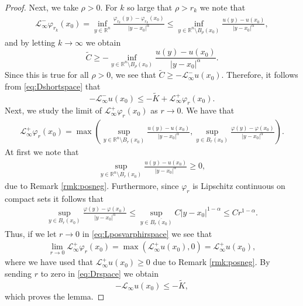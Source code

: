 \documentclass[11pt]{article}
\providecommand{\Linf}{\mathcal{L}_{\infty}}
\providecommand{\Lpos}{\mathcal{L}_{\infty}^+}
\providecommand{\Lneg}{\mathcal{L}_{\infty}^-}
\providecommand{\Rn}{\mathbb{R}^n}
\numberwithin{equation}{section}
\theoremstyle{definition}
\begin{document}
\begin{proof}
 Next, we take $\rho >0$. For $k$ so large that $\rho > r_k$ we note that
\begin{align*}
    \Lneg \varphi_{r_k}(x_0) = \inf_{y \in \Rn} \frac{\varphi_{r_k}(y)-\varphi_{r_k}(x_0)}{|y-x_0|^{\alpha}} \leq \inf_{y \in \Rn \setminus B_{\rho}(x_0)} \frac{u(y)-u(x_0)}{|y-x_0|^{\alpha}},
\end{align*}
and by letting $k \to \infty$ we obtain
\begin{equation*}
    \tilde{C} \geq - \inf_{y \in \Rn \setminus B_{\rho}(x_0)} \frac{u(y)-u(x_0)}{|y-x_0|^{\alpha}}.
\end{equation*}
Since this is true for all $\rho >0 $, we see that $\tilde{C} \geq - \Lneg u(x_0)$. Therefore, it follows from \eqref{eq:Dshortspace} that
\begin{equation}\label{eq:Drspace}
    -\Lneg u(x_0) \leq -\tilde{K} + \Lpos \varphi_{r}(x_0).
\end{equation}
Next, we study the limit of $\Lpos \varphi_{r}(x_0)$ as $r \to 0$. We have that
\begin{align}\label{eq:Lposvarphirspace}
    \Lpos \varphi_r(x_0) = \max\left(\sup_{y \in \Rn \setminus B_r(x_0) } \frac{u(y)-u(x_0)}{|y-x_0|^{\alpha}}, \sup_{y \in B_r(x_0)} \frac{\varphi(y)-\varphi(x_0)}{|y-x_0|^{\alpha}}\right).
\end{align}
At first we note that 
\begin{align*}
   \sup_{y \in \Rn \setminus B_r(x_0)} \frac{u(y)-u(x_0)}{|y-x_0|^{\alpha}} \geq 0,
\end{align*}
due to Remark \ref{rmk:posneg}. Furthermore, since $\varphi_r$ is Lipschitz continuous on compact sets it follows that
\begin{align*}
    \sup_{y \in B_r(x_0)} \frac{\varphi(y)-\varphi(x_0)}{|y-x_0|^{\alpha}} \leq \sup_{y \in \overline{B_r(x_0)}} C |y-x_0|^{1-\alpha} \leq C r^{1-\alpha}.
\end{align*}
 Thus, if we let $r \to 0$ in \eqref{eq:Lposvarphirspace} we see that
\begin{align*}
   \lim_{r \to 0} \Lpos \varphi_r(x_0) = \max\left(\Lpos u(x_0),0 \right) = \Lpos u(x_0),
\end{align*}
where we have used that $\Lpos u(x_0) \geq 0$ due to Remark \ref{rmk:posneg}. By sending $r$ to zero in \eqref{eq:Drspace} we obtain
 \begin{equation*}
-\Linf u(x_0) \leq -\tilde{K},
 \end{equation*}
 which proves the lemma.
\end{proof}
\end{document}
